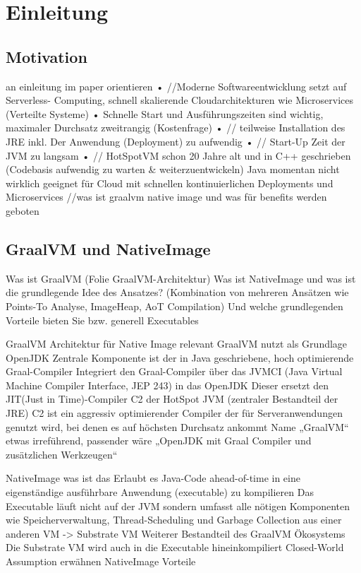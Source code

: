 \section{Einleitung}
\label{sec:einleitung}

\subsection{Motivation}
\label{subsec:motivation}
an einleitung im paper orientieren
    • //Moderne Softwareentwicklung setzt auf Serverless- Computing, schnell skalierende Cloudarchitekturen wie Microservices (Verteilte Systeme)
    • Schnelle Start und Ausführungszeiten sind wichtig, maximaler Durchsatz zweitrangig (Kostenfrage)
    • // teilweise Installation des JRE inkl. Der Anwendung (Deployment) zu aufwendig
    • // Start-Up Zeit der JVM zu langsam
    • // HotSpotVM schon 20 Jahre alt und in C++ geschrieben (Codebasis aufwendig zu warten \& weiterzuentwickeln)
Java momentan nicht wirklich geeignet für Cloud mit schnellen kontinuierlichen Deployments und Microservices
//was ist graalvm native image und was für benefits werden geboten

\subsection{GraalVM und NativeImage}
\label{subsec:graalvmnativeimage}
Was ist GraalVM (Folie GraalVM-Architektur)
Was ist NativeImage und was ist die grundlegende Idee des Ansatzes? (Kombination von mehreren Ansätzen wie Points-To Analyse, ImageHeap, AoT Compilation)
Und welche grundlegenden Vorteile bieten Sie bzw. generell Executables

GraalVM Architektur für Native Image relevant
GraalVM nutzt als Grundlage OpenJDK
Zentrale Komponente ist der in Java geschriebene, hoch optimierende Graal-Compiler
Integriert den Graal-Compiler über das JVMCI (Java Virtual Machine Compiler Interface, JEP 243) in das OpenJDK
Dieser ersetzt den JIT(Just in Time)-Compiler C2 der HotSpot JVM (zentraler Bestandteil der JRE)
C2 ist ein aggressiv optimierender Compiler der für Serveranwendungen genutzt wird, bei denen es auf höchsten Durchsatz ankommt
Name „GraalVM“ etwas irreführend, passender wäre „OpenJDK mit Graal Compiler und zusätzlichen Werkzeugen“

NativeImage was ist das
Erlaubt es Java-Code ahead-of-time in eine eigenständige ausführbare Anwendung (executable) zu kompilieren
Das Executable läuft nicht auf der JVM sondern umfasst alle nötigen Komponenten wie Speicherverwaltung, Thread-Scheduling und Garbage Collection aus einer anderen VM -> Substrate VM
Weiterer Bestandteil des GraalVM Ökosystems
Die Substrate VM wird auch in die Executable hineinkompiliert
Closed-World Assumption erwähnen
NativeImage Vorteile

